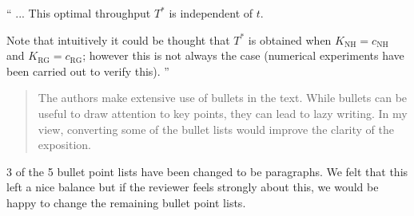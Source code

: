\documentclass{article}
\newcommand{\NH}{\text{NH}}
\newcommand{\RG}{\text{RG}}
\begin{document}
``
... This optimal throughput \(T^*\) is
independent of \(t\).

Note that intuitively it could be thought that \(T^*\) is obtained when
\(K_{\NH}=c_{\NH}\) and \(K_{\RG}=c_{\RG}\); however this is not always the case
(numerical experiments have been carried out to verify this).
''


\begin{quote}
    \begin{textit}
        {
The authors make extensive use of bullets in the text. While bullets
can be useful to draw attention to key points, they can lead to lazy
writing. In my view, converting some of the bullet lists would improve
the clarity of the exposition.
        }
    \end{textit}
\end{quote}

3 of the 5 bullet point lists have been changed to be paragraphs. We felt that
this left a nice balance but if the reviewer feels strongly about this, we
would be happy to change the remaining bullet point lists.
\end{document}
